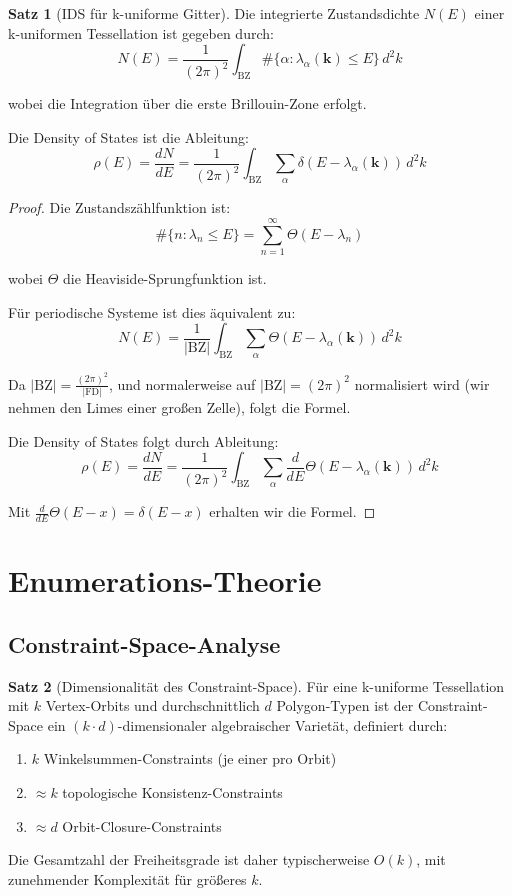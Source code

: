 \documentclass[a4paper,12pt]{article}
\theoremstyle{definition}
\newtheorem{satz}{Satz}[section]
\begin{document}
\begin{satz}[IDS für k-uniforme Gitter]
	Die integrierte Zustandsdichte $N(E)$ einer k-uniformen Tessellation ist gegeben durch:
	\[
	N(E) = \frac{1}{(2\pi)^2} \int_{\text{BZ}} \#\{ \alpha : \lambda_\alpha(\mathbf{k}) \leq E \} \, d^2k
	\]
	
	wobei die Integration über die erste Brillouin-Zone erfolgt.
	
	Die Density of States ist die Ableitung:
	\[
	\rho(E) = \frac{dN}{dE} = \frac{1}{(2\pi)^2} \int_{\text{BZ}} \sum_\alpha \delta(E - \lambda_\alpha(\mathbf{k})) \, d^2k
	\]
\end{satz}

\begin{proof}
	Die Zustandszählfunktion ist:
	\[
	\#\{ n : \lambda_n \leq E \} = \sum_{n=1}^{\infty} \Theta(E - \lambda_n)
	\]
	
	wobei $\Theta$ die Heaviside-Sprungfunktion ist.
	
	Für periodische Systeme ist dies äquivalent zu:
	\[
	N(E) = \frac{1}{|\text{BZ}|} \int_{\text{BZ}} \sum_\alpha \Theta(E - \lambda_\alpha(\mathbf{k})) \, d^2k
	\]
	
	Da $|\text{BZ}| = \frac{(2\pi)^2}{|\text{FD}|}$, und normalerweise auf $|\text{BZ}| = (2\pi)^2$ normalisiert wird (wir nehmen den Limes einer großen Zelle), folgt die Formel.
	
	Die Density of States folgt durch Ableitung:
	\[
	\rho(E) = \frac{dN}{dE} = \frac{1}{(2\pi)^2} \int_{\text{BZ}} \sum_\alpha \frac{d}{dE} \Theta(E - \lambda_\alpha(\mathbf{k})) \, d^2k
	\]
	
	Mit $\frac{d}{dE} \Theta(E - x) = \delta(E - x)$ erhalten wir die Formel.
\end{proof}

\section{Enumerations-Theorie}

\subsection{Constraint-Space-Analyse}

\begin{satz}[Dimensionalität des Constraint-Space]
	Für eine k-uniforme Tessellation mit $k$ Vertex-Orbits und durchschnittlich $d$ Polygon-Typen ist der Constraint-Space ein $(k \cdot d)$-dimensionaler algebraischer Varietät, definiert durch:
	
	\begin{enumerate}
		\item $k$ Winkelsummen-Constraints (je einer pro Orbit)
		\item $\approx k$ topologische Konsistenz-Constraints
		\item $\approx d$ Orbit-Closure-Constraints
	\end{enumerate}
	
	Die Gesamtzahl der Freiheitsgrade ist daher typischerweise $O(k)$, mit zunehmender Komplexität für größeres $k$.
\end{satz}
\end{document}
